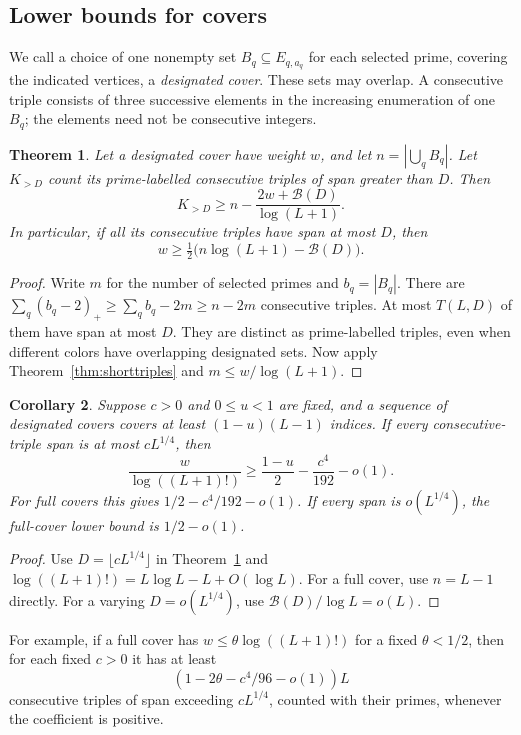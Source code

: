 \documentclass[11pt]{amsart}
\newtheorem{theorem}{Theorem}[section]
\newtheorem{corollary}[theorem]{Corollary}
\theoremstyle{definition}
\theoremstyle{remark}
\begin{document}
\subsection{Lower bounds for covers}
We call a choice of one nonempty set
$B_q\subseteq E_{q,a_q}$ for each selected prime, covering the indicated
vertices, a \emph{designated cover}. These sets may overlap. A consecutive
triple consists of three successive elements in the increasing
enumeration of one $B_q$; the elements need not be consecutive integers.

\begin{theorem}\label{thm:localcover}
Let a designated cover have weight $w$, and let
$n=|\bigcup_q B_q|$. Let $K_{>D}$ count its prime-labelled consecutive
triples of span greater than $D$. Then
\[
K_{>D}\geq n-\frac{2w+\mathcal B(D)}{\log(L+1)}.
\]
In particular, if all its consecutive triples have span at most $D$,
then
\[
w\geq\tfrac12\bigl(n\log(L+1)-\mathcal B(D)\bigr).
\]
\end{theorem}
\begin{proof}
Write $m$ for the number of selected primes and $b_q=|B_q|$.
There are $\sum_q(b_q-2)_+\geq\sum_qb_q-2m\geq n-2m$
consecutive triples. At most $T(L,D)$ of them have span at most $D$.
They are distinct as prime-labelled triples, even when different colors
have overlapping designated sets. Now apply Theorem~\ref{thm:shorttriples}
and $m\leq w/\log(L+1)$.
\end{proof}

\begin{corollary}\label{cor:localcost}
Suppose $c>0$ and $0\leq u<1$ are fixed, and a sequence of designated
covers covers at least $(1-u)(L-1)$ indices. If every consecutive-triple span
is at most $cL^{1/4}$, then
\[
\frac{w}{\log((L+1)!)}\geq\frac{1-u}{2}-\frac{c^4}{192}-o(1).
\]
For full covers this gives $1/2-c^4/192-o(1)$. If every span is
$o(L^{1/4})$, the full-cover lower bound is $1/2-o(1)$.
\end{corollary}
\begin{proof}
Use $D=\lfloor cL^{1/4}\rfloor$ in Theorem~\ref{thm:localcover} and
$\log((L+1)!)=L\log L-L+O(\log L)$. For a full cover, use $n=L-1$
directly. For a varying $D=o(L^{1/4})$, use $\mathcal B(D)/\log L=o(L)$.
\end{proof}

For example, if a full cover has $w\leq\theta\log((L+1)!)$ for a fixed
$\theta<1/2$, then for each fixed $c>0$ it has at least
\[
(1-2\theta-c^4/96-o(1))L
\]
consecutive triples of span exceeding $cL^{1/4}$, counted with their
primes, whenever the coefficient is positive.
\end{document}
